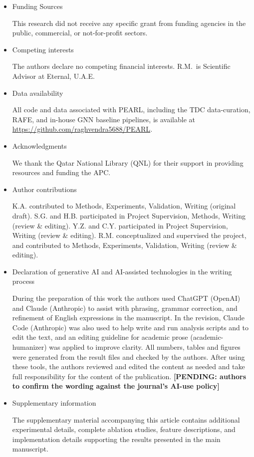 \documentclass[pdflatex,sn-basic]{sn-jnl}%
\newcommand{\pending}[1]{{\color{red}\textbf{[PENDING: #1]}}}%
\begin{document}
\begin{itemize}
\item Funding Sources

This research did not receive any specific grant from funding agencies in the public, commercial, or not-for-profit sectors.

\item Competing interests

The authors declare no competing financial interests. R.M.\ is Scientific Advisor at Eternal, U.A.E.

\item Data availability

All code and data associated with PEARL, including the TDC data-curation, RAFE, and in-house GNN baseline pipelines, is available at \url{https://github.com/raghvendra5688/PEARL}.

\item Acknowledgments

We thank the Qatar National Library (QNL) for their support in providing resources and funding the APC.

\item Author contributions

K.A. contributed to Methods, Experiments, Validation, Writing (original draft). S.G. and H.B. participated in Project Supervision, Methods, Writing (review \& editing). Y.Z. and C.Y. participated in Project Supervision, Writing (review \& editing). R.M. conceptualized and supervised the project, and contributed to Methods, Experiments, Validation, Writing (review \& editing).

\item{Declaration of generative AI and AI-assisted technologies in the writing process}

During the preparation of this work the authors used ChatGPT (OpenAI) and Claude (Anthropic) to assist with phrasing, grammar correction, and refinement of English expressions in the manuscript. In the revision, Claude Code (Anthropic) was also used to help write and run analysis scripts and to edit the text, and an editing guideline for academic prose (academic-humanizer) was applied to improve clarity. All numbers, tables and figures were generated from the result files and checked by the authors. After using these tools, the authors reviewed and edited the content as needed and take full responsibility for the content of the publication. \pending{authors to confirm the wording against the journal's AI-use policy}

\item{Supplementary information}

The supplementary material accompanying this article contains additional experimental details, complete ablation studies, feature descriptions, and implementation details supporting the results presented in the main manuscript.

\end{itemize}
\end{document}
